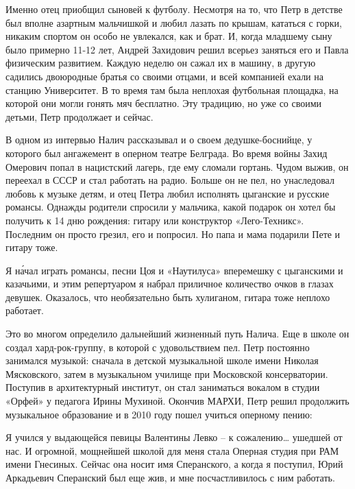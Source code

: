 Именно отец приобщил сыновей к футболу. Несмотря на то, что Петр в детстве был вполне азартным мальчишкой и любил лазать по крышам, кататься с горки, никаким спортом он особо не увлекался, как и брат. И, когда младшему сыну было примерно 11-12 лет, Андрей Захидович решил всерьез заняться его и Павла физическим развитием. Каждую неделю он сажал их в машину, в другую садились двоюродные братья со своими отцами, и всей компанией ехали на станцию Университет. В то время там была неплохая футбольная площадка, на которой они могли гонять мяч бесплатно. Эту традицию, но уже со своими детьми, Петр продолжает и сейчас.

В одном из интервью Налич рассказывал и о своем дедушке-боснийце, у которого был ангажемент в оперном театре Белграда. Во время войны Захид Омерович попал в нацистский лагерь, где ему сломали гортань. Чудом выжив, он переехал в СССР и стал работать на радио. Больше он не пел, но унаследовал любовь к музыке детям, и отец Петра любил исполнять цыганские и русские романсы. Однажды родители спросили у мальчика, какой подарок он хотел бы получить к 14 дню рождения: гитару или конструктор «Лего-Техникс». Последним он просто грезил, его и попросил. Но папа и мама подарили Пете и гитару тоже.

\begin{fancyquotes}
    Я н\'{а}чал играть романсы, песни Цоя и «Наутилуса» вперемешку с цыганскими и казачьими, и этим репертуаром я набрал приличное количество очков в глазах девушек. Оказалось, что необязательно быть хулиганом, гитара тоже неплохо работает.
\end{fancyquotes}

Это во многом определило дальнейший жизненный путь Налича. Еще в школе он создал хард-рок-группу, в которой с удовольствием пел. Петр постоянно занимался музыкой: сначала в детской музыкальной школе имени Николая Мясковского, затем в музыкальном училище при Московской консерватории. Поступив в архитектурный институт, он стал заниматься вокалом в студии «Орфей» у педагога Ирины Мухиной. Окончив МАРХИ, Петр решил продолжить музыкальное образование и в 2010 году пошел учиться оперному пению:

\begin{fancyquotes}
    Я учился у выдающейся певицы Валентины Левко – к сожалению… ушедшей от нас. И огромной, мощнейшей школой для меня стала Оперная студия при РАМ имени Гнесиных. Сейчас она носит имя Сперанского, а когда я поступил, Юрий Аркадьевич Сперанский был еще жив, и мне посчастливилось с ним работать.
\end{fancyquotes}


